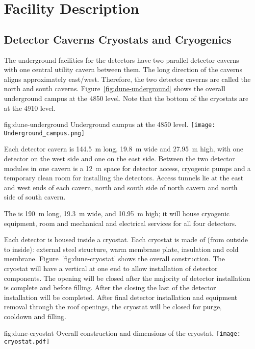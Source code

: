 ﻿\chapter{Facility Description}
\label{vl:tc-facility}


\section{Detector Caverns Cryostats and Cryogenics}
\label{sec:fdsp-coord-faci-caverns}


The underground facilities for the  detectors have two parallel
detector caverns with one central utility cavern between them. The
long direction of the caverns aligns approximately
east/west. Therefore, the two detector caverns are called the north
and south caverns. Figure~\ref{fig:dune-underground} shows the overall
underground campus at the  4850 level. Note that the bottom of the cryostats are at the 4910 level.
\begin{dunefigure}{fig:dune-underground}
  {Underground campus at the 4850 level.}
  \texttt{[image: Underground\_campus.png]}
\end{dunefigure}
Each detector cavern is \SI{144.5}{\meter} long, \SI{19.8}{\meter}
wide and \SI{27.95}{\meter} high, with one detector on the west side
and one on the east side. Between the two detector modules in one
cavern is a \SI{12}{\meter} space for detector access, cryogenic pumps and
a temporary clean
room for installing the detectors. Access tunnels lie at the east and
west ends of each cavern, north and south side of north cavern and
north side of south cavern.


The  is \SI{190}{\meter} long, \SI{19.3}{\meter}
wide, and \SI{10.95}{\meter} high; it will house cryogenic equipment, 
room and mechanical and electrical services for all four
detectors.


Each detector is housed inside a cryostat. Each cryostat is made of
(from outside to inside): external steel structure, warm membrane
plate, insulation and cold membrane. Figure~\ref{fig:dune-cryostat}
shows the overall construction. The cryostat will have a vertical
 at one end to allow installation of detector components. The
opening will be closed after the majority of detector installation is
complete and before filling. After the  closing the last of the
detector installation will be completed. After final detector
installation and equipment removal through the roof openings, the
cryostat will be closed for purge, cooldown and filling.
\begin{dunefigure}{fig:dune-cryostat}
  {Overall construction and dimensions of the  cryostat.}
  \texttt{[image: cryostat.pdf]}
\end{dunefigure}


